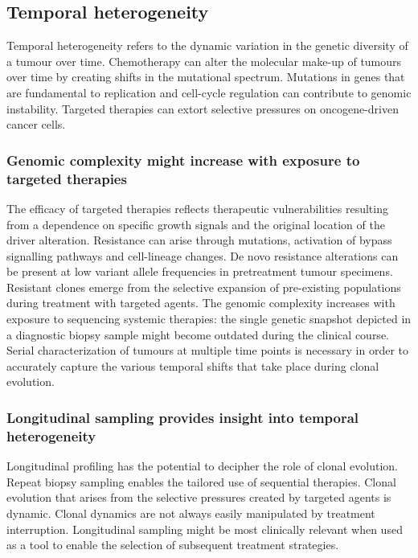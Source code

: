 	\subsection{Temporal heterogeneity}
	Temporal heterogeneity refers to the dynamic variation in the genetic diversity of a tumour over time.
	Chemotherapy can alter the molecular make-up of tumours over time by creating shifts in the mutational spectrum.
	Mutations in genes that are fundamental to replication and cell-cycle regulation can contribute to genomic instability.
	Targeted therapies can extort selective pressures on oncogene-driven cancer cells.

		\subsubsection{Genomic complexity might increase with exposure to targeted therapies}
		The efficacy of targeted therapies reflects therapeutic vulnerabilities resulting from a dependence on specific growth signals and the original location of the driver alteration.
		Resistance can arise through mutations, activation of bypass signalling pathways and cell-lineage changes.
		De novo resistance alterations can be present at low variant allele frequencies in pretreatment tumour specimens.
		Resistant clones emerge from the selective expansion of pre-existing populations during treatment with targeted agents.
		The genomic complexity increases with exposure to sequencing systemic therapies: the single genetic snapshot depicted in a diagnostic biopsy sample might become outdated during the clinical course.
		Serial characterization of tumours at multiple time points is necessary in order to accurately capture the various temporal shifts that take place during clonal evolution.

		\subsubsection{Longitudinal sampling provides insight into temporal heterogeneity}
		Longitudinal profiling has the potential to decipher the role of clonal evolution.
		Repeat biopsy sampling enables the tailored use of sequential therapies.
		Clonal evolution that arises from the selective pressures created by targeted agents is dynamic.
		Clonal dynamics are not always easily manipulated by treatment interruption.
		Longitudinal sampling might be most clinically relevant when used as a tool to enable the selection of subsequent treatment strategies.

